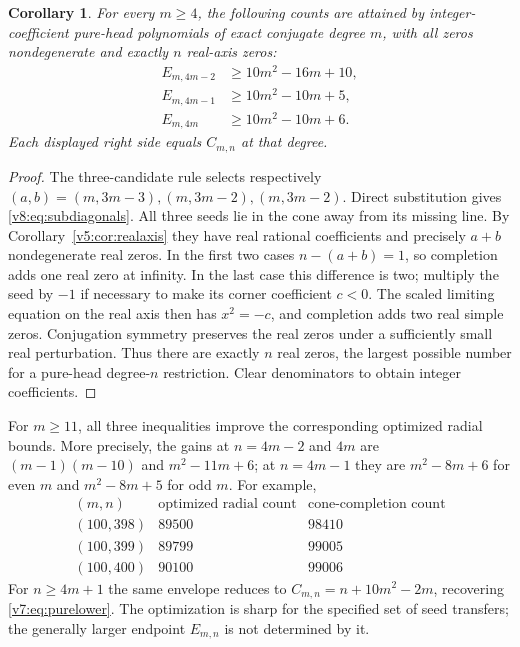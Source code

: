 \documentclass[UTF8,11pt]{ctexart}
\newtheorem{cor}[thm]{Corollary}
\theoremstyle{definition}
\numberwithin{equation}{section}
\begin{document}
\begin{cor}\label{v8:cor:subdiagonals}
For every $m\ge4$, the following counts are attained by
integer-coefficient pure-head polynomials of exact conjugate degree
$m$, with all zeros nondegenerate and exactly $n$ real-axis zeros:
\begin{equation}\label{v8:eq:subdiagonals}
 \begin{aligned}
 E_{m,4m-2}&\ge10m^2-16m+10,\\
 E_{m,4m-1}&\ge10m^2-10m+5,\\
 E_{m,4m}&\ge10m^2-10m+6.
 \end{aligned}
\end{equation}
Each displayed right side equals $C_{m,n}$ at that degree.
\end{cor}
\begin{proof}
The three-candidate rule selects respectively
$(a,b)=(m,3m-3),(m,3m-2),(m,3m-2)$.
Direct substitution gives \eqref{v8:eq:subdiagonals}.
All three seeds lie in the cone away from its missing line.
By Corollary~\ref{v5:cor:realaxis} they have real rational
coefficients and precisely $a+b$ nondegenerate real zeros.
In the first two cases $n-(a+b)=1$, so completion adds one real
zero at infinity. In the last case this difference is two;
multiply the seed by $-1$ if necessary to make its corner
coefficient $c<0$. The scaled limiting equation on the real axis
then has $x^2=-c$, and completion adds two real simple zeros.
Conjugation symmetry preserves the real zeros under a sufficiently
small real perturbation. Thus there are exactly $n$ real zeros,
the largest possible number for a pure-head degree-$n$ restriction.
Clear denominators to obtain integer coefficients.
\end{proof}

For $m\ge11$, all three inequalities improve the corresponding
optimized radial bounds. More precisely, the gains at $n=4m-2$
and $4m$ are $(m-1)(m-10)$ and $m^2-11m+6$; at $n=4m-1$ they
are $m^2-8m+6$ for even $m$ and $m^2-8m+5$ for odd $m$.
For example,
\[
 \begin{array}{c|r|r}
 (m,n)&\text{optimized radial count}&\text{cone-completion count}\\
 \hline
 (100,398)&89500&98410\\
 (100,399)&89799&99005\\
 (100,400)&90100&99006
 \end{array}
\]
For $n\ge4m+1$ the same envelope reduces to
$C_{m,n}=n+10m^2-2m$, recovering \eqref{v7:eq:purelower}.
The optimization is sharp for the specified set of seed transfers;
the generally larger endpoint $E_{m,n}$ is not determined by it.
\end{document}
